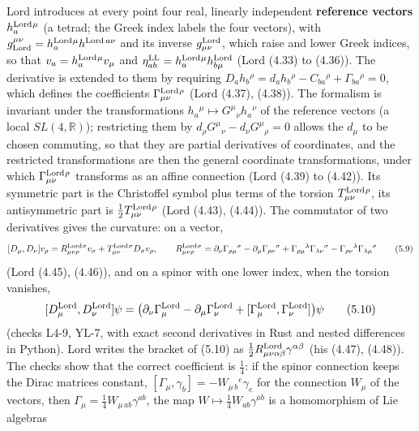 \documentclass[
  10pt,
]{article}
\begin{document}
Lord introduces at every point four real, linearly independent
\textbf{reference vectors} \(h^{\rm Lord}_a{}^\mu\) (a tetrad; the Greek
index labels the four vectors), with
\(g^{\mu\nu}_{\rm Lord}=h^{\rm Lord}_a{}^\mu h^{{\rm Lord}\,a\nu}\) and
its inverse \(g^{\rm Lord}_{\mu\nu}\), which raise and lower Greek
indices, so that \(v_a=h^{\rm Lord}_a{}^\mu v_\mu\) and
\(\eta^{\rm LL}_{ab}=h^{\rm Lord}_a{}^\mu h^{\rm Lord}_{b\mu}\) (Lord
(4.33) to (4.36)). The derivative is extended to them by requiring
\(D_ah_b{}^\rho=d_ah_b{}^\rho-C_{ba}{}^\rho+\Gamma_{ba}{}^\rho=0\),
which defines the coefficients \(\Gamma^{\rm Lord}_{\mu\nu}{}^\rho\)
(Lord (4.37), (4.38)). The formalism is invariant under the
transformations \(h_a{}^\mu\mapsto G^\mu{}_\nu h_a{}^\nu\) of the
reference vectors (a local \(SL(4,\mathbb R)\)); restricting them by
\(d_\rho G^\mu{}_\nu-d_\nu G^\mu{}_\rho=0\) allows the \(d_\mu\) to be
chosen commuting, so that they are partial derivatives of coordinates,
and the restricted transformations are then the general coordinate
transformations, under which \(\Gamma^{\rm Lord}_{\mu\nu}{}^\rho\)
transforms as an affine connection (Lord (4.39) to (4.42)). Its
symmetric part is the Christoffel symbol plus terms of the torsion
\(T^{\rm Lord}_{\mu\nu}{}^\rho\), its antisymmetric part is
\(\tfrac12T^{\rm Lord}_{\mu\nu}{}^\rho\) (Lord (4.43), (4.44)). The
commutator of two derivatives gives the curvature: on a vector,
\[[D_\mu,D_\nu]v_\rho=R^{\rm Lord}_{\mu\nu\rho}{}^\sigma v_\sigma+T^{\rm Lord}_{\mu\nu}{}^\sigma D_\sigma v_\rho,\qquad
R^{\rm Lord}_{\mu\nu\rho}{}^\sigma=\partial_\nu\Gamma_{\rho\mu}{}^\sigma-\partial_\mu\Gamma_{\rho\nu}{}^\sigma+\Gamma_{\rho\mu}{}^\lambda\Gamma_{\lambda\nu}{}^\sigma-\Gamma_{\rho\nu}{}^\lambda\Gamma_{\lambda\mu}{}^\sigma\tag{5.9}\]
(Lord (4.45), (4.46)), and on a spinor with one lower index, when the
torsion vanishes,
\[[D^{\rm Lord}_\mu,D^{\rm Lord}_\nu]\psi=\big(\partial_\nu\Gamma^{\rm Lord}_\mu-\partial_\mu\Gamma^{\rm Lord}_\nu+[\Gamma^{\rm Lord}_\mu,\Gamma^{\rm Lord}_\nu]\big)\psi\tag{5.10}\]
(checks L4-9, YL-7, with exact second derivatives in Rust and nested
differences in Python). Lord writes the bracket of (5.10) as
\(\tfrac12R^{\rm Lord}_{\mu\nu\alpha\beta}\gamma^{\alpha\beta}\) (his
(4.47), (4.48)). The checks show that the correct coefficient is
\(\tfrac14\): if the spinor connection keeps the Dirac matrices
constant, \([\Gamma_\mu,\gamma_b]=-W_{\mu\,b}{}^e\gamma_e\) for the
connection \(W_\mu\) of the vectors, then
\(\Gamma_\mu=\tfrac14W_{\mu\,ab}\gamma^{ab}\), the map
\(W\mapsto\tfrac14W_{ab}\gamma^{ab}\) is a homomorphism of Lie algebras
\end{document}
